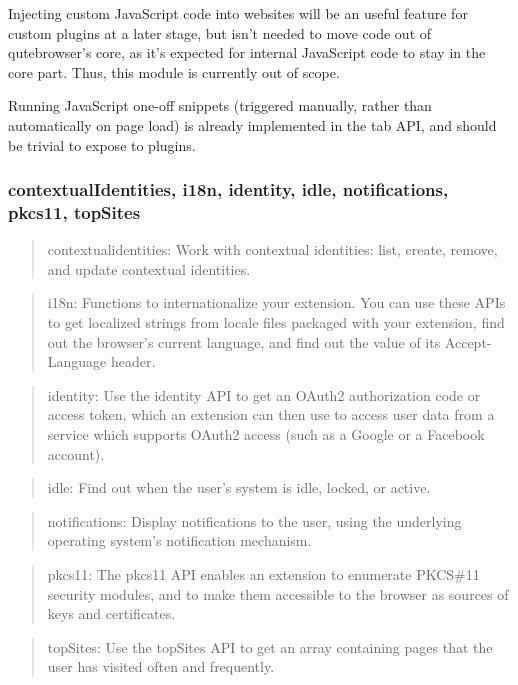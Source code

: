 \documentclass[a4paper,parskip=full]{scrreprt}
\begin{document}
Injecting custom JavaScript code into websites will be an useful feature for
custom plugins at a later stage, but isn't needed to move code out of
qutebrowser's core, as it's expected for internal JavaScript code to stay in the
core part. Thus, this module is currently out of scope.

Running JavaScript one-off snippets (triggered manually, rather than
automatically on page load) is already implemented in the tab API, and should be
trivial to expose to plugins.

\subsubsection{contextualIdentities, i18n, identity, idle, notifications, pkcs11, topSites}
\begin{quote}
contextualidentities: Work with contextual identities: list, create, remove, and update contextual identities.
\end{quote}
\begin{quote}
i18n: Functions to internationalize your extension. You can use these APIs to get localized strings from locale files packaged with your extension, find out the browser's current language, and find out the value of its Accept-Language header.
\end{quote}
\begin{quote}
identity: Use the identity API to get an OAuth2 authorization code or access token, which an extension can then use to access user data from a service which supports OAuth2 access (such as a Google or a Facebook account).
\end{quote}
\begin{quote}
idle: Find out when the user's system is idle, locked, or active.
\end{quote}
\begin{quote}
notifications: Display notifications to the user, using the underlying operating system's notification mechanism.
\end{quote}
\begin{quote}
pkcs11: The pkcs11 API enables an extension to enumerate PKCS\#11 security modules, and to make them accessible to the browser as sources of keys and certificates.
\end{quote}
\begin{quote}
topSites: Use the topSites API to get an array containing pages that the user has visited often and frequently.
\end{quote}
\end{document}
